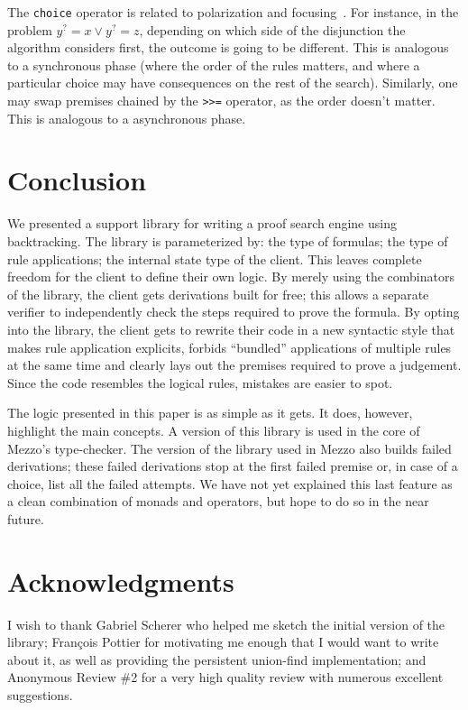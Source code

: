 \documentclass{easychair}
\def\li{\lstinline}
\newcommand{\f}[1]{\ensuremath{#1^?}} %
\begin{document}
The \li+choice+ operator is related to polarization and
focusing~\cite{liang-miller-07}. For instance, in the problem $\f y = x \vee \f
y = z$, depending on which side of the disjunction the algorithm considers first,
the outcome is going to be different. This is analogous to a synchronous phase
(where the order of the rules matters, and where a particular choice may have
consequences on the rest of the search). Similarly, one may swap premises
chained by the \li+>>=+ operator, as the order doesn't matter. This is analogous
to a asynchronous phase.

\section{Conclusion}

We presented a support library for writing a proof search engine using
backtracking. The library is parameterized by: the type of formulas; the type of
rule applications; the internal state type of the client. This leaves complete
freedom for the client to define their own logic. By merely using the
combinators of the library, the client gets derivations built for free; this allows
a separate verifier to independently check the steps required to prove the
formula. By opting into the library, the client gets to rewrite their code in a
new syntactic style that makes rule application explicits, forbids ``bundled''
applications of multiple rules at the same time and clearly lays out the
premises required to prove a judgement. Since the code resembles the logical
rules, mistakes are easier to spot.

The logic presented in this paper is as simple as it gets. It does, however,
highlight the main concepts. A version of this library is used in the core of
Mezzo's type-checker. The version of the library used in Mezzo also builds
failed derivations; these failed derivations stop at the first failed premise
or, in case of a choice, list all the failed attempts. We have not yet explained
this last feature as a clean combination of monads and operators, but hope to do
so in the near future.

\section*{Acknowledgments}

I wish to thank Gabriel Scherer who helped me sketch the initial version of the
library; François Pottier for motivating me enough that I would want to write
about it, as well as providing the persistent union-find implementation; and
Anonymous Review \#2 for a very high quality review with numerous excellent
suggestions.



\end{document}
